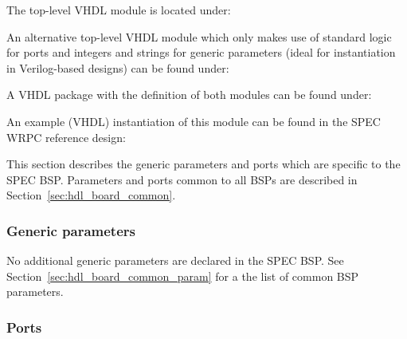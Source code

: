The top-level VHDL module is located under: \\

An alternative top-level VHDL module which only makes use of standard logic for ports and integers
and strings for generic parameters (ideal for instantiation in Verilog-based designs) can be found
under: \\

A VHDL package with the definition of both modules can be found under:
\\

An example (VHDL) instantiation of this module can be found in the SPEC WRPC reference design:
\\

This section describes the generic parameters and ports which are specific to the SPEC BSP.
Parameters and ports common to all BSPs are described in Section~\ref{sec:hdl_board_common}.

\subsubsection{Generic parameters}

No additional generic parameters are declared in the SPEC BSP. See
Section~\ref{sec:hdl_board_common_param} for a the list of common BSP parameters.


\subsubsection{Ports}

